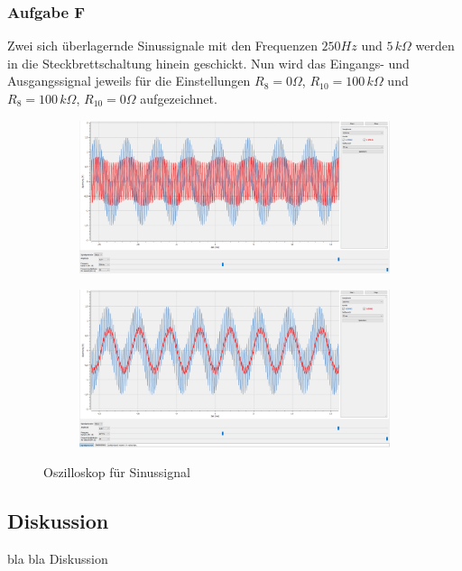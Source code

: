 \subsubsection{Aufgabe F}
Zwei sich überlagernde Sinussignale mit den Frequenzen $\si{250}{Hz}$ und $\si{5}{\,k\Omega}$ werden in die Steckbrettschaltung hinein geschickt. Nun wird das Eingangs- und Ausgangssignal jeweils für die Einstellungen $R_{8}=\si{0}{\Omega}$, $R_{10}=\si{100}{\,k\Omega}$ und $R_{8}=\si{100}{\,k\Omega}$, $R_{10}=\si{0}{\Omega}$ aufgezeichnet.

\begin{figure}[h]
\centering
\begin{subfigure}{1\textwidth}
\centering
  \includegraphics[width=17cm]{pics/3.3f_0_100}
  \label{sin0_1}
\end{subfigure}
\begin{subfigure}{1\textwidth}
\centering
  \includegraphics[width=17cm]{pics/3.3f_100_0}
  \label{sin1_0}
\end{subfigure}
\caption{Oszilloskop für Sinussignal}
\end{figure}



\subsection{Diskussion}
bla bla Diskussion


